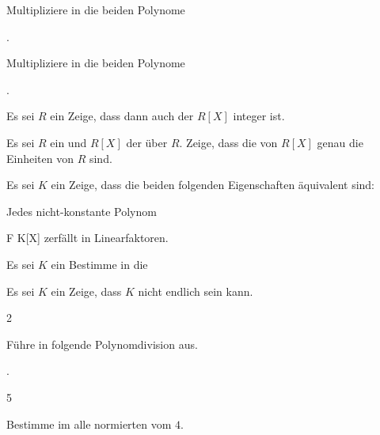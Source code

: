 {}
{
Multipliziere in
\mathl{\Z[x,y,z]}{} die beiden Polynome

 { . }


}
{} {}


{}
{
Multipliziere in
 die beiden Polynome

 { . }


}
{} {}


{}
{
Es sei $R$ ein
Zeige, dass dann auch der
$R[X]$ integer ist.

}
{} {}


{}
{
Es sei $R$ ein
und $R[X]$ der
über $R$. Zeige, dass die
von $R[X]$ genau die Einheiten von $R$ sind.

}
{} {}


{}
{
Es sei $K$ ein
Zeige, dass die beiden folgenden Eigenschaften äquivalent sind:
 {Jedes nicht-konstante Polynom

\mavergleichskette
{\vergleichskette
{ F
}
{ \in }{ K[X]
}
{  }{
}
{    }{
}
{   }{
}
}
{}{}{}
zerfällt in Linearfaktoren.
}

}
{} {}


{}
{
Es sei $K$ ein
Bestimme in
 die

}
{} {}


{}
{
Es sei $K$ ein
Zeige, dass $K$ nicht endlich sein kann.

}
{} {}




{2}
{
Führe in
 folgende Polynomdivision aus.

 { . }


}
{} {}


{5}
{
Bestimme im 
  alle normierten  vom  $4$.

}
{} {}


